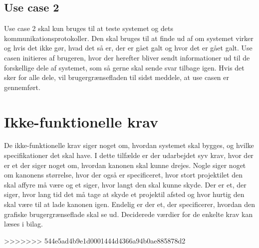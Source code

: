 \subsection{Use case 2}
Use case 2 skal kun bruges til at teste systemet og dets kommunikationsprotokoller. Den skal bruges til at finde ud af om systemet virker og hvis det ikke gør, hvad det så er, der er gået galt og hvor det er gået galt. Use casen initieres af brugeren, hvor der herefter bliver sendt informationer ud til de forskellige dele af systemet, som så gerne skal sende svar tilbage igen. Hvis det sker for alle dele, vil brugergrænsefladen til sidst meddele, at use casen er gennemført. 


\section{Ikke-funktionelle krav}
De ikke-funktionelle krav siger noget om, hvordan systemet skal bygges, og hvilke specifikationer det skal have. I dette tilfælde er der udarbejdet syv krav, hvor der er et der siger noget om, hvordan kanonen skal kunne drejes. Nogle siger noget om kanonens størrelse, hvor der også er specificeret, hvor stort projektilet den skal affyre må være og et siger, hvor langt den skal kunne skyde. Der er et, der siger, hvor lang tid det må tage at skyde et projektil afsted og hvor hurtig den skal være til at lade kanonen igen. Endelig er der et, der specificerer, hvordan den grafiske brugergrænseflade skal se ud. Deciderede værdier for de enkelte krav kan læses i bilag. 









>>>>>>> 544e5ad4b9e1d0001444d4366a94b0ae885878d2
